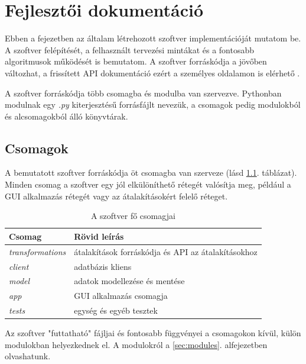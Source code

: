 \chapter{Fejlesztői dokumentáció}
\label{ch:impl}


Ebben a fejezetben az általam létrehozott szoftver implementációját mutatom be.
A szoftver felépítését, a felhasznált tervezési mintákat és
a fontosabb algoritmusok működését is bemutatom.
A szoftver forráskódja a jövőben változhat,
a frissített API dokumentáció ezért a személyes oldalamon is elérhető \cite{apidoc}.

A szoftver forráskódja több csomagba és modulba van szervezve.
Pythonban modulnak egy \emph{.py} kiterjesztésű forrásfájlt nevezük,
a csomagok pedig modulokból és alcsomagokból álló könyvtárak.

\section{Csomagok}

A bemutatott szoftver forráskódja öt csomagba van szerveze (lásd \ref{tab:packages}. táblázat).
Minden csomag a szoftver egy jól elkülöníthető rétegét valósítja meg,
például a GUI alkalmazás rétegét vagy az átalakításokért felelő réteget.

\begin{table}[H]
	\centering
	\begin{tabular}{ | m{} | m{} | }
		\hline
		\textbf{Csomag} & \textbf{Rövid leírás} \\
		\hline \hline
		\emph{transformations} & átalakítások forráskódja és API az átalakításokhoz \\
		\hline
		\emph{client} & adatbázis kliens \\
		\hline
		\emph{model} & adatok modellezése és mentése \\
		\hline
		\emph{app} & GUI alkalmazás csomagja \\
		\hline
		\emph{tests} & egység és egyéb tesztek \\
		\hline
	\end{tabular}
	\caption{A szoftver fő csomagjai}
	\label{tab:packages}
\end{table}

Az szoftver "futtatható" fájljai és fontosabb függvényei a csomagokon kívül, külön modulokban helyezkednek el.
A modulokról a \ref{sec:modules}. alfejezetben olvashatunk.


